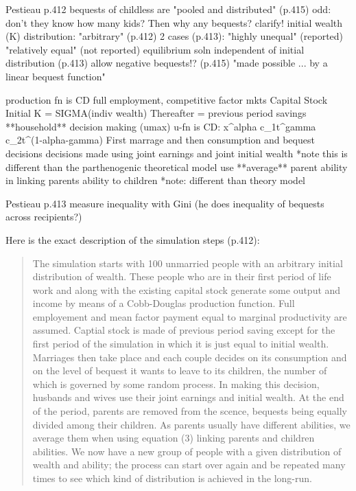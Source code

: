 \documentclass{article}
\begin{document}
\begin{verbatimtab}[4]
Pestieau p.412
        bequests of childless are "pooled and distributed" (p.415)
		odd: don't they know how many kids? Then why any bequests? clarify!
	initial wealth (K) distribution:
		"arbitrary" (p.412)
		2 cases (p.413):
			"highly unequal" (reported)
			"relatively equal" (not reported)
			equilibrium soln independent of initial distribution (p.413)
	allow negative bequests!? (p.415)
		"made possible ... by a linear bequest function"
			
	production fn is CD
	full employment, competitive factor mkts
	Capital Stock
		Initial K = SIGMA(indiv wealth)
		Thereafter = previous period savings
	**household** decision making (umax)
		u-fn is CD: x^alpha c_{1}t^gamma c_{2}t^(1-alpha-gamma)
	First marrage and then consumption and bequest decisions
		decisions made using joint earnings and joint initial wealth
			*note this is different than the parthenogenic theoretical model
	use **average** parent ability in linking parents ability to children
		*note: different than theory model
	
Pestieau p.413
	measure inequality with Gini (he does inequality of bequests across recipients?)

\end{verbatimtab}

Here is the exact description of the simulation steps (p.412):
\begin{quote}
The simulation starts with 100 unmarried people with an arbitrary initial distribution of wealth.
These people who are in their first period of life work and along with the existing capital stock
generate some output and income by means of a Cobb-Douglas production function.
Full employement and mean factor payment equal to marginal productivity are assumed.
Captial stock is made of previous period saving except for the first period of the simulation in
which it is just equal to initial wealth.
Marriages then take place and each couple decides on its consumption and on the level of bequest
it wants to leave to its children,
the number of which is governed by some random process.
In making this decision, husbands and wives use their joint earnings and initial wealth.
At the end of the period, parents are removed from the scence,
bequests being equally divided among their children.
As parents usually have different abilities, we average them when using equation (3)
linking parents and children abilities.
We now have a new group of people with a given distribution of wealth and ability;
the process can start over again and be repeated many times to see which kind of
distribution is achieved in the long-run.
\end{quote}
\end{document}
